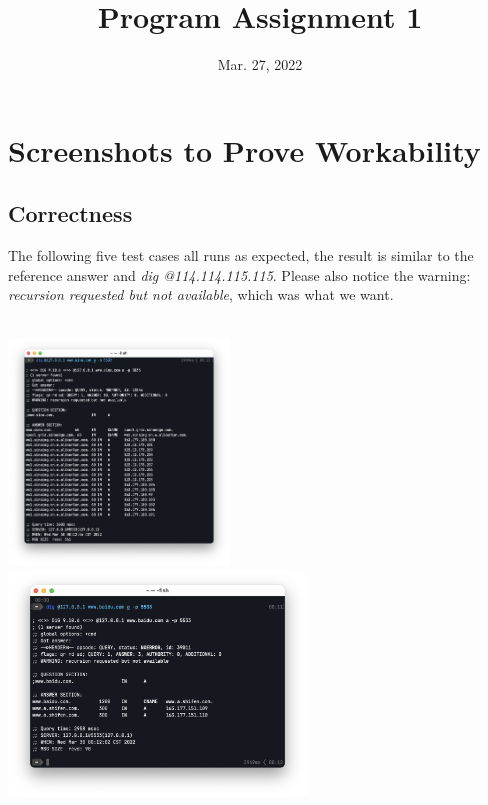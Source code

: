 \documentclass[onecolumn, oneside, ctexart]{SUSTechHomework}
\title{Program Assignment 1}
\date{Mar. 27, 2022}
\begin{document}
\maketitle
\toc

\section{Screenshots to Prove Workability}
\subsection{Correctness}
The following five test cases all runs as expected, the result is similar  to the reference answer and \textit{dig @114.114.115.115}. Please also notice the warning: \emph{recursion requested but not available}, which was what we want.\\~\\
\centerline{\includegraphics[height=6cm]{fig/c0}\quad
			\includegraphics[height=6cm]{fig/c1}}\\
\end{document}
